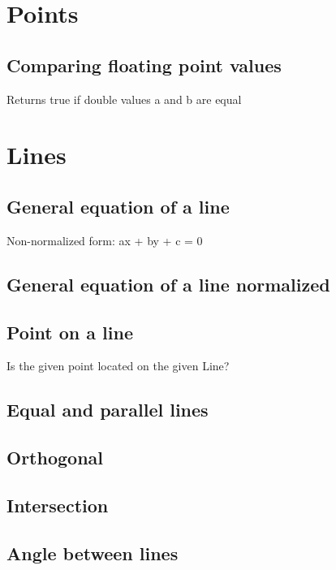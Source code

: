\section{Points}
\subsection{Comparing floating point values}
Returns true if double values a and b are equal


\section{Lines}
\subsection{General equation of a line}
Non-normalized form: ax + by + c = 0

\subsection{General equation of a line normalized}

\subsection{Point on a line}
Is the given point located on the given Line?

\subsection{Equal and parallel lines}

\subsection{Orthogonal}

\subsection{Intersection}

\subsection{Angle between lines}

